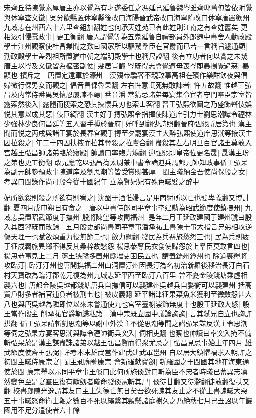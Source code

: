 宋齊丘待陳覺素厚唐主亦以覺為有才遂委任之馮延己延魯魏岑雖齊邸舊僚皆依附覺與休寧查文徽|{
	吳分歙縣置休寧縣後改曰海陽晉武帝改曰海寧隋改曰休寧唐置歙州九域志在州西六十六里查鉏加翻姓也何承天姓苑已有此姓則江南之有查姓舊矣}
更相汲引侵蠧政事|{
	更工衡翻}
唐人謂覺等為五鬼延魯自禮部員外郎遷中書舍人勤政殿學士江州觀察使杜昌業聞之歎曰國家所以驅駕羣臣在官爵而已若一言稱旨遽通顯|{
	勤政殿學士盖烈祖所置猶中朝之端明殿學士也稱尺證翻}
後有立功者何以賞之未幾唐主以岑及文徽皆為樞密副使|{
	幾居豈翻}
岑既得志會覺遭母喪岑即暴揚覺過惡|{
	暴顯也}
擯斥之　唐置定遠軍於濠州　漢殤帝驕奢不親政事高祖在殯作樂酣飲夜與倡婦微行倮男女而觀之|{
	倡音昌倮魯果翻}
左右忤意輒死無敢諫者|{
	忤五故翻}
惟越王弘昌及内常侍番禺吳懷恩屢諫不聼|{
	番音潘}
常猜忌諸弟每宴集令宦者守門羣臣宗室皆露索然後入|{
	露體而搜索之恐其挾懷兵刃也索山客翻}
晉王弘熙欲圖之乃盛飾聲伎娛悦其意以成其惡|{
	伎巨綺翻}
漢主好手搏弘熙令指揮使陳道庠引力士劉思潮譚令禋林少強林少良何昌廷等五人習手搏於晉府|{
	好呼到翻少詩照翻晉府弘熙所居第也}
漢主聞而悦之丙戌與諸王宴於長春宫觀手搏至夕罷宴漢主大醉弘熙使道庠思潮等掖漢主因拉殺之|{
	年二十四因扶掖而拉其脅殺之拉盧合翻}
盡殺其左右明旦百官諸王莫敢入宫越王弘昌帥諸弟臨於寢殿|{
	帥讀曰率臨力鴆翻}
迎弘熙即皇帝位更名晟|{
	晟漢主玢之弟也更工衡翻}
改元應乾以弘昌為太尉兼中書令諸道兵馬都元帥知政事循王弘杲為副元帥參預政事陳道庠及劉思潮等皆受賞賜甚厚　閩主曦納金吾使尚保殷之女|{
	考異曰閩錄作尚可殷今從十國紀年}
立為賢妃妃有殊色曦嬖之醉中

妃所欲殺則殺之所欲有則宥之|{
	沈酗于酒惟婦言是用商紂所以亡也嬖卑義翻又博計翻}
夏四月戊申朔日有食之　唐以中書侍郎同平章事李建勲為昭武節度使鎮撫州|{
	九域志吳置昭武節度于撫州}
殷將陳望等攻閩福州|{
	是年二月王延政建國于建州號曰殷}
入其西郛既而敗歸　五月殷吏部尚書同平章事潘承祐上書陳十事大指言兄弟相攻逆傷天理一也賦斂煩重力役無節二也|{
	斂力贍翻}
發民為兵羇旅愁怨三也|{
	民為兵則疲于征戍羇旅異鄉不得反其桑梓故愁怨}
楊思㳟奪民衣食使歸怨於上羣臣莫敢言四也|{
	楊思恭事見上二月}
疆土狹隘多置州縣增吏困民五也|{
	謂置鏞州鐔州也}
除道裹糧將攻臨汀|{
	臨汀汀州也唐開撫福二州山洞置汀州因長汀為名初治新羅後移治長汀白石村天寶改為臨汀郡乾元復為州九域志延平西至臨汀八百里}
曾不憂金陵錢塘乘虛相襲六也|{
	唐都金陵吳越都錢塘唐兵自撫信可以襲建州吳越兵自婺衢可以襲建州}
括高貲戶財多者補官逋負者被刑七也|{
	被皮義翻}
延平諸津征果菜魚米獲利至微斂怨甚大八也與唐吳越為隣即位以來未嘗通使九也宫室臺榭崇飾無度十也殷王延政大怒|{
	殷王當作殷主}
削承祐官爵勒歸私第　漢中宗既立國中議論詾詾|{
	言其弑兄自立也詾許拱翻}
循王弘杲請斬劉思潮等以謝中外漢主不從思潮等聞之譛弘杲謀反漢主令思潮等伺之弘杲方宴客思潮與譚令禋帥衛兵突入|{
	伺相吏翻也察也帥讀曰率突入掩不備}
斬弘杲於是漢主謀盡誅諸弟以越王弘昌賢而得衆尤忌之|{
	弘昌見忌事始上年四月}
雄武節度使齊王弘弼|{
	詳考本末雄武當作建武建武軍邕州}
自以居大鎮懼禍求入朝許之　初閩主曦侍康宗宴|{
	閩主昶廟號康宗}
會新羅獻寶劔|{
	新羅國之于閩國其地在海東通使於閩}
康宗舉以示同平章事王倓曰此何所施倓對曰斬為臣不忠者時曦已蓄異志凛然變色至是宴羣臣復有獻劔者曦命發倓冡斬其尸|{
	倓徒甘翻又徒濫翻徒敢翻復扶又翻}
校書郎陳光逸謂其友曰主上失德亡無日矣吾欲死諫其友止之不從上書諫曦大惡五十事曦怒命衛士鞭之數百不死以繩繫其頸懸諸庭樹久之乃絶秋七月己丑詔以年饑國用不足分遣使者六十餘


